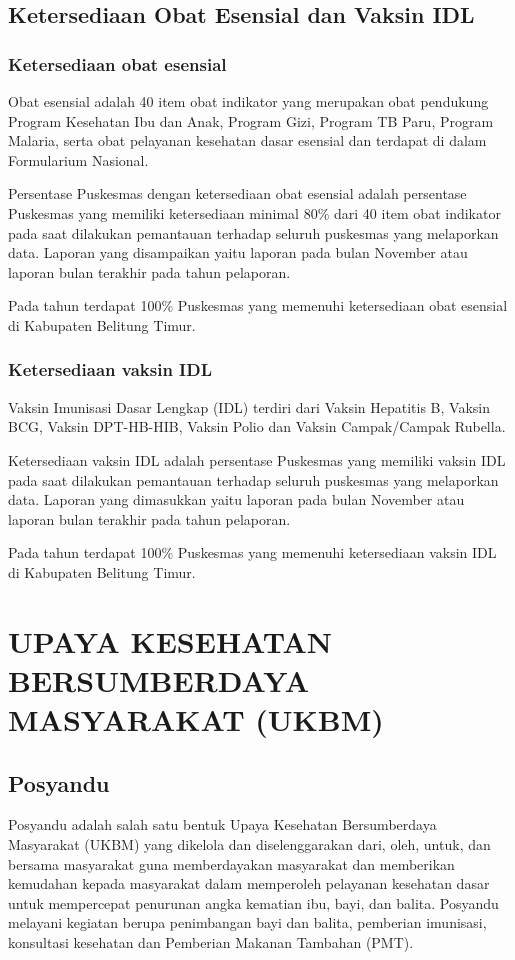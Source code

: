 \subsection{Ketersediaan Obat Esensial dan Vaksin IDL}
\subsubsection{Ketersediaan obat esensial}
Obat esensial adalah 40 item obat indikator yang merupakan obat pendukung Program Kesehatan Ibu dan Anak, Program Gizi, Program TB Paru, Program Malaria, serta obat pelayanan kesehatan dasar esensial dan terdapat di dalam Formularium Nasional.

Persentase Puskesmas dengan ketersediaan obat esensial adalah persentase Puskesmas yang memiliki ketersediaan minimal 80\% dari 40 item obat indikator pada saat dilakukan pemantauan terhadap
seluruh puskesmas yang melaporkan data. Laporan yang disampaikan yaitu laporan pada bulan November atau laporan bulan terakhir pada tahun pelaporan.

Pada tahun \tP terdapat 100\% Puskesmas yang memenuhi ketersediaan obat esensial di Kabupaten Belitung Timur.

\subsubsection{Ketersediaan vaksin IDL}
Vaksin Imunisasi Dasar Lengkap (IDL) terdiri dari Vaksin Hepatitis B, Vaksin BCG, Vaksin DPT-HB-HIB, Vaksin Polio dan Vaksin Campak/Campak Rubella.

Ketersediaan vaksin IDL adalah persentase Puskesmas yang memiliki vaksin IDL pada saat dilakukan pemantauan terhadap seluruh puskesmas yang melaporkan data. Laporan yang dimasukkan yaitu laporan pada bulan November atau laporan bulan terakhir pada tahun pelaporan.

Pada tahun \tP terdapat 100\% Puskesmas yang memenuhi ketersediaan vaksin IDL di Kabupaten Belitung Timur.


\section[UKBM]{UPAYA KESEHATAN BERSUMBERDAYA MASYARAKAT (UKBM)}%
\subsection{Posyandu}
Posyandu adalah salah satu bentuk Upaya Kesehatan Bersumberdaya Masyarakat (UKBM) yang dikelola dan diselenggarakan dari, oleh, untuk, dan bersama masyarakat guna memberdayakan masyarakat dan memberikan kemudahan kepada masyarakat dalam memperoleh pelayanan kesehatan dasar untuk mempercepat penurunan angka kematian ibu, bayi, dan balita. Posyandu melayani kegiatan berupa penimbangan bayi dan balita, pemberian imunisasi, konsultasi kesehatan dan Pemberian Makanan Tambahan (PMT).

